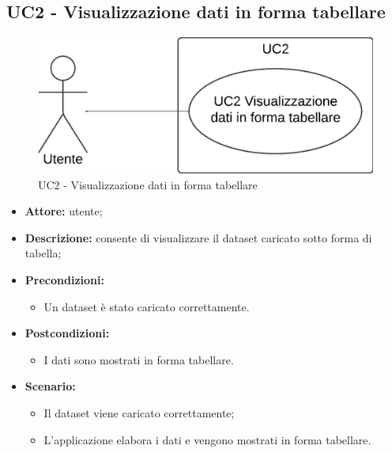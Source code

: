 \subsection{UC2 - Visualizzazione dati in forma tabellare}
\begin{figure}[h!]
    \centering
    \includegraphics[scale=0.7]{template/images/UC2.png}
    \caption{UC2 - Visualizzazione dati in forma tabellare}
\end{figure}
\begin{itemize}
    \item \textbf{Attore:} utente;
    \item \textbf{Descrizione:} consente di visualizzare il dataset caricato sotto forma di tabella;
    \item \textbf{Precondizioni:}
    \begin{itemize}
        \item Un dataset è stato caricato correttamente.
    \end{itemize}
    \item \textbf{Postcondizioni:}
    \begin{itemize}
        \item I dati sono mostrati in forma tabellare.
    \end{itemize}
    \item \textbf{Scenario:}
    \begin{itemize}
        \item Il dataset viene caricato correttamente;
        \item L'applicazione elabora i dati e vengono mostrati in forma tabellare.
    \end{itemize}
\end{itemize}
